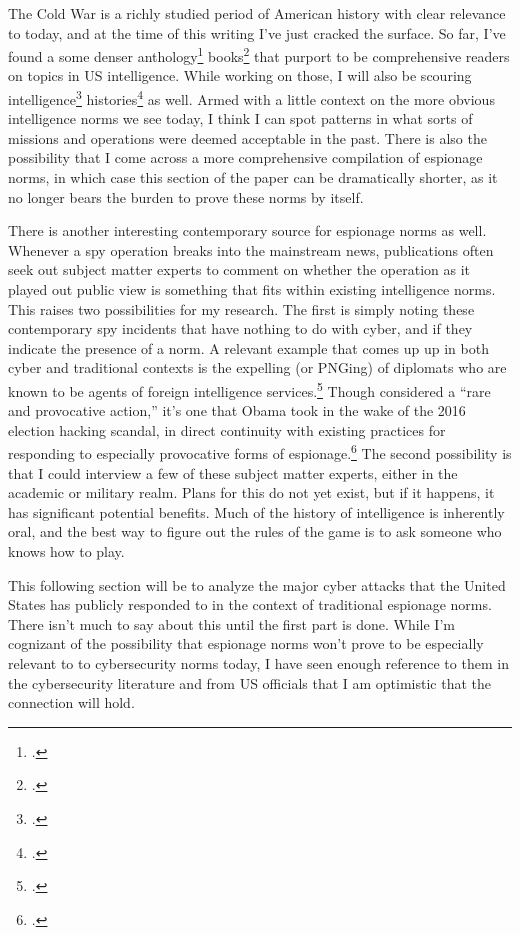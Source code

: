 \documentclass{report}
\begin{document}
\begin{refsegment}
The Cold War is a richly studied period of American history with clear relevance to today, and at the time of this writing I've just cracked the surface. So far, I've found a some denser anthology\footcite{andrew_secret_2009} books\footcite{johnson_intelligence_2015} that purport to be comprehensive readers on topics in US intelligence. While working on those, I will also be scouring intelligence\footcite{prados_william_2009} histories\footcite{prados_presidents_1996} as well. Armed with a little context on the more obvious intelligence norms we see today, I think I can spot patterns in what sorts of missions and operations were deemed acceptable in the past. There is also the possibility that I come across a more comprehensive compilation of espionage norms, in which case this section of the paper can be dramatically shorter, as it no longer bears the burden to prove these norms by itself.

There is another interesting contemporary source for espionage norms as well. Whenever a spy operation breaks into the mainstream news, publications often seek out subject matter experts to comment on whether the operation as it played out public view is something that fits within existing intelligence norms. This raises two possibilities for my research. The first is simply noting these contemporary spy incidents that have nothing to do with cyber, and if they indicate the presence of a norm. A relevant example that comes up up in both cyber and traditional contexts is the expelling (or PNGing) of diplomats who are known to be agents of foreign intelligence services.\footcite{risen_rules_2001} Though considered a ``rare and provocative action,'' it's one that Obama took in the wake of the 2016 election hacking scandal, in direct continuity with existing practices for responding to especially provocative forms of espionage.\footcite{mazzetti_game_2017} The second possibility is that I could interview a few of these subject matter experts, either in the academic or military realm. Plans for this do not yet exist, but if it happens, it has significant potential benefits. Much of the history of intelligence is inherently oral, and the best way to figure out the rules of the game is to ask someone who knows how to play.

This following section will be to analyze the major cyber attacks that the United States has publicly responded to in the context of traditional espionage norms. There isn't much to say about this until the first part is done. While I'm cognizant of the possibility that espionage norms won't prove to be especially relevant to to cybersecurity norms today, I have seen enough reference to them in the cybersecurity literature and from US officials that I am optimistic that the connection will hold.

\newpage
\printbibliography[heading=subbibliography]

\end{refsegment}
\end{document}
